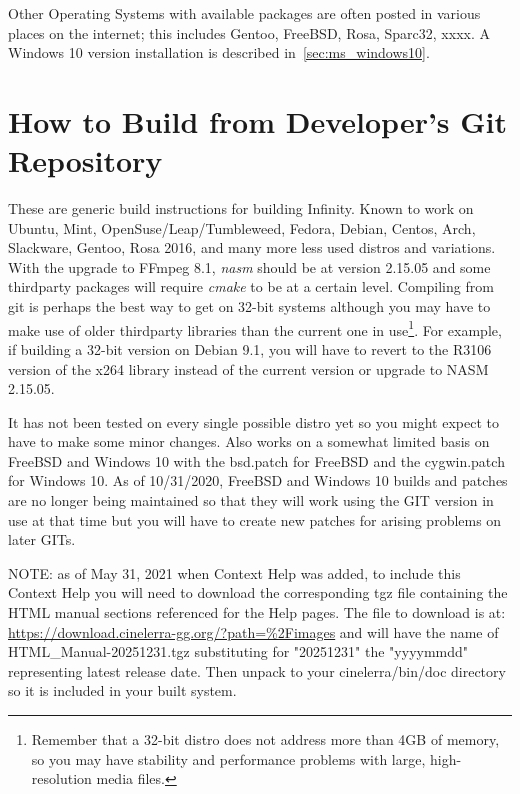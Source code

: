 Other Operating Systems with available packages are often posted in various
places on the internet; this includes Gentoo, FreeBSD, Rosa, Sparc32, xxxx.  
A Windows 10 version installation is described in~\ref{sec:ms_windows10}.

\section{How to Build \CGG{} from Developer's Git Repository}%
\label{sec:How_to_build}

These are generic build instructions for building \CGG{} Infinity.
Known to work on Ubuntu, Mint, OpenSuse/Leap/Tumbleweed, Fedora, Debian,
Centos, Arch, Slackware, Gentoo, Rosa 2016, and many more less used distros
and variations.  With the upgrade to FFmpeg 8.1, \textit{nasm} should be
at version 2.15.05 and some thirdparty packages will require \textit{cmake} to be
at a certain level.
Compiling from git is perhaps the best way to get \CGG{} on 32-bit systems although
you may have to make use of older thirdparty libraries than the current one in use\protect\footnote{Remember that a 32-bit distro does not address more than 4GB of memory, so you may have stability and performance problems with large, high-resolution media files.}. For example,
if building a 32-bit version on Debian 9.1, you will have to revert to the R3106 version
of the x264 library instead of the current version or upgrade to NASM 2.15.05.

It has not been tested on every
single possible distro yet so you might expect to have to make
some minor changes.  Also works on a somewhat limited basis on
FreeBSD and Windows 10 with the bsd.patch for FreeBSD and the
cygwin.patch for Windows 10. As of 10/31/2020, FreeBSD and Windows
10 builds and patches are no longer being maintained so that they
will work using the GIT version in use at that time but you will
have to create new patches for arising problems on later GITs.

NOTE: as of May 31, 2021 when Context Help was added, to include
this Context Help you will need to download the corresponding
tgz file containing the HTML manual sections referenced for the
Help pages.  The file to download is at:
\url{https://download.cinelerra-gg.org/?path=\%2Fimages}
and will have the name of HTML\_Manual-20251231.tgz substituting for
"20251231" the "yyyymmdd" representing latest release date.
Then unpack to your cinelerra/bin/doc directory so it is included in
your built system.

